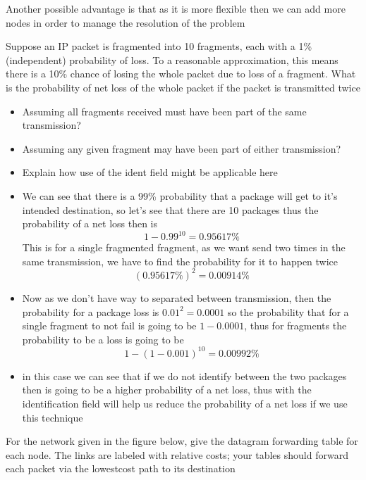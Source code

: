 \documentclass{assignment}
\begin{document}
Another possible advantage is that as it is more flexible then we can add more
nodes in order to manage the resolution of the problem


\newpage
\begin{ex}
Suppose an IP packet is fragmented into 10 fragments, each with a 1\% (independent)
probability of loss. To a reasonable approximation, this means there is a 10\% chance of losing
the whole packet due to loss of a fragment. What is the probability of net loss of the whole
packet if the packet is transmitted twice
\begin{itemize}
\item Assuming all fragments received must have been part of the same transmission?
\item Assuming any given fragment may have been part of either transmission?
\item Explain how use of the ident field might be applicable here
\end{itemize}
\end{ex}
\begin{itemize}
  \item We can see that there is a 99\% probability that a package will get to
    it's intended destination, so let's see that there are 10 packages thus the
    probability of a net loss then is 
    $$1-0.99^{10} = 0.95617\%$$
    This is for a single fragmented fragment, as we want send two times in the
    same transmission, we have to find the probability for it to happen twice
    $$ (0.95617\%)^2 = 0.00914\%$$
  \item Now as we don't have way to separated between transmission, then the
    probability for a package loss is $0.01^2 = 0.0001$ so the probability that
    for a single fragment to not fail is going to be $1-0.0001$, thus
    for fragments the probability to be a loss is going to be
    $$1-(1-0.001)^{10} = 0.00992\%$$
  \item in this case we can see that if we do not identify between the two
    packages then is going to be a higher probability of a net loss, thus with
    the identification field will help us reduce the probability of a net loss
    if we use this technique
\end{itemize}

\newpage
\begin{ex}
  For the network given in the figure below, give the datagram forwarding table for each node.
The links are labeled with relative costs; your tables should forward each packet via the lowestcost path to its destination

\end{ex}
\end{document}
